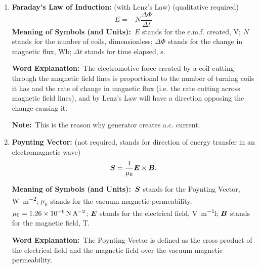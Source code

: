 \documentclass[8pt]{article}
\newcommand{\MeanSymb}{\textbf{Meaning of Symbols (and Units):}\ }
\newcommand{\WordExpl}{\textbf{Word Explanation:}\ }
\newcommand{\DeriForm}{\textbf{Derived Formulae:}\ }
\newcommand{\Note}{\textbf{Note:}\ }
\begin{document}
\begin{enumerate}
                \WordExpl The magnetic flux is the dot product of the magnetic flux density and the surface (as the name suggests).

                \DeriForm Let \(\theta\) be the angle between the surface vector and the magnetic field, we have
                \[
                    \Phi = BS \cos \theta.
                \]

                Furthermore,
                \[
                    \Phi = \iint_{\Sigma} \vect{B} \cdot \diff \vect{S}.
                \]

                \Note This will be useful for the next part: the Faraday's Law of Induction.

                \item \textbf{Faraday's Law of Induction:} (with Lenz's Law) (qualitative required)
                \[
                    E = -N \frac{\Delta \Phi}{\Delta t}
                \]
                \MeanSymb \(E\) stands for the e.m.f. created, \unit{\volt}; \(N\) stands for the number of coils, dimensionless; \(\Delta \Phi\) stands for the change in magnetic flux, \unit{\weber}; \(\Delta t\) stands for time elapsed, \unit{\second}.

                \WordExpl The electromotive force created by a coil cutting through the magnetic field lines is proportional to the number of turning coils it has and the rate of change in magnetic flux (i.e. the rate cutting across magnetic field lines), and by Lenz's Law will have a direction opposing the change causing it.

                \Note This is the reason why generator creates a.c. current.

                \item \textbf{Poynting Vector:} (not required, stands for direction of energy transfer in an electromagnetic wave)
                \[
                    \boldsymbol{S} = \frac{1}{\mu_0} \boldsymbol{E} \times \boldsymbol{B}.
                \]

                \MeanSymb \(\boldsymbol{S}\) stands for the Poynting Vector, \unit{\watt \per \metre \squared}; \(\mu_0\) stands for the vacuum magnetic permeability, \(\mu_0 = \qty{1.26 e -6}{\newton \per \ampere \squared}\); \(\boldsymbol{E}\) stands for the electrical field, \unit{\volt \per \metre}l; \(\boldsymbol{B}\) stands for the magnetic field, \unit{\tesla}.

                \WordExpl The Poynting Vector is defined as the cross product of the electrical field and the magnetic field over the vacuum magnetic permeability.


\end{enumerate}
\end{document}
